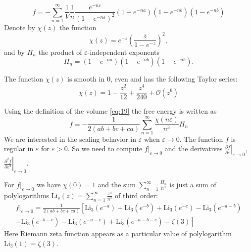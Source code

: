\documentclass{article}
\newcommand{\Li}{\mathrm{Li}}
\begin{document}
\begin{equation}
  \label{eq:38}
  f=-\sum_{n=1}^{\infty}
  \frac{1}{V}\frac{1}{n}\frac{e^{-n\varepsilon}}{\left(1-e^{-n\varepsilon}\right)^{2}}
  \left(1-e^{-na}\right)\left(1-e^{-nb}\right)\left(1-e^{-nb}\right) 
\end{equation}
Denote by $\chi(z)$ the function
\begin{equation}
  \label{eq:39}
  \chi(z)=e^{-z}\left(\frac{z}{1-e^{-z}}\right)^{2}, 
\end{equation}
and by $H_{n}$ the product of $\varepsilon$-independent exponents
\begin{equation}
  \label{eq:40}
  H_{n}=\left(1-e^{-na}\right)\left(1-e^{-nb}\right)\left(1-e^{-nb}\right).
\end{equation}

The function $\chi(z)$ is smooth in 0, even and has the following Taylor series:
\begin{equation}
  \label{eq:45}
  \chi(z)=1 - \frac{z^2}{12} + \frac{z^4}{240}+\mathcal{O}(z^{6})
\end{equation}

Using the definition of the volume \eqref{eq:19} the free energy is written as
\begin{equation}
  \label{eq:41}
  f=-\frac{1}{2(ab+bc+ca)} \sum _{n=1}^{\infty} \frac{\chi(n\varepsilon)}{n^{3}} H_{n}
\end{equation}
We are interested in the scaling behavior in $\varepsilon$ when $\varepsilon\to 0$. The function $f$
is regular in $\varepsilon$ for $\varepsilon>0$. So we need to
compute  $\left.f\right|_{\varepsilon\to 0}$ and the derivatives $\left.\frac{\partial f}{\partial
  \varepsilon}\right|_{\varepsilon\to 0}$, $\left.\frac{\partial^{2} f}{\partial
  \varepsilon^{2}}\right|_{\varepsilon\to 0}$.

For $\left.f\right|_{\varepsilon\to 0}$ we have $\chi(0)=1$ and the sum $\sum_{n=1}^{\infty}
\frac{H_{n}}{n^{3}}$ is just a sum of  polylogarithms
$\mathrm{Li}_{s}(z)=\sum_{n=1}^{\infty}\frac{z^{n}}{n^{s}}$ of third order:
\begin{multline}
  \label{eq:42}
  \left.f\right|_{\varepsilon\to 0} =\frac{1}{2(ab+bc+ca)}\left[\Li_{3}(e^{-a})+\Li_{3}(e^{-b})+\Li_{3}(e^{-c})-
    \Li_{3}(e^{-a-b})\right.\\
  \left.-\Li_{3}(e^{-b-c})-    \Li_{3}(e^{-a-c})+    \Li_{3}(e^{-a-b-c})-\zeta(3)\right]
\end{multline}
Here Riemann zeta function appears as a particular value of polylogarithm $\Li_{3}(1)=\zeta(3)$.
\end{document}
